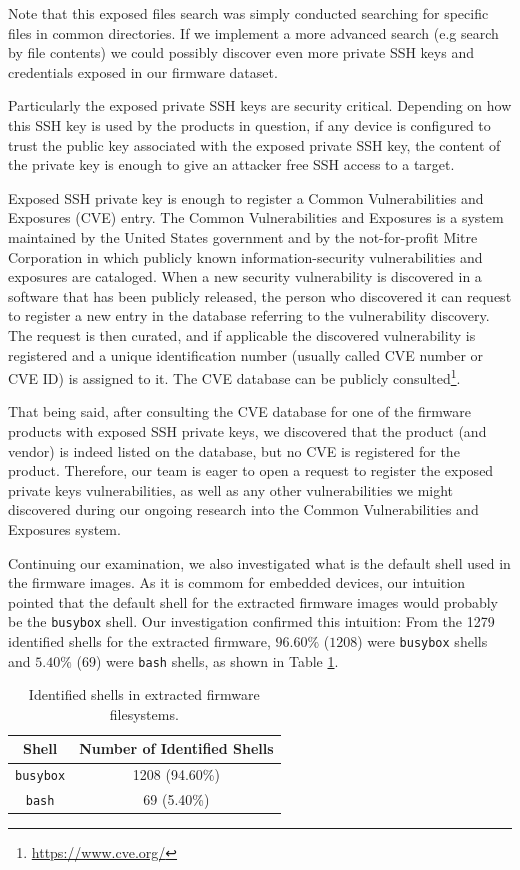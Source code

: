 Note that this exposed files search was simply conducted searching for specific files in common directories. If we implement a more advanced search (e.g search by file contents) we could possibly discover even more private SSH keys and credentials exposed in our firmware dataset.

Particularly the exposed private SSH keys are security critical. Depending on how this SSH key is used by the products in question, if any device is configured to trust the public key associated with the exposed private SSH key, the content of the private key is enough to give an attacker free SSH access to a target.

Exposed SSH private key is enough to register a Common Vulnerabilities and Exposures (CVE) entry. The Common Vulnerabilities and Exposures is a system maintained by the United States government and by the not-for-profit Mitre Corporation in which publicly known information-security vulnerabilities and exposures are cataloged. When a new security vulnerability is discovered in a software that has been publicly released, the person who discovered it can request to register a new entry in the database referring to the vulnerability discovery. The request is then curated, and if applicable the discovered vulnerability is registered and a unique identification number (usually called CVE number or CVE ID) is assigned to it. The CVE database can be publicly consulted\footnote{\url{https://www.cve.org/}}.

That being said, after consulting the CVE database for one of the firmware products with exposed SSH private keys, we discovered that the product (and vendor) is indeed listed on the database, but no CVE is registered for the product. Therefore, our team is eager to open a request to register the exposed private keys vulnerabilities, as well as any other vulnerabilities we might discovered during our ongoing research into the Common Vulnerabilities and Exposures system.

Continuing our examination, we also investigated what is the default shell used in the firmware images. As it is commom for embedded devices, our intuition pointed that the default shell for the extracted firmware images would probably be the {\tt busybox} shell. Our investigation confirmed this intuition: From the 1279 identified shells for the extracted firmware, $96.60\%$ ($1208$) were {\tt busybox} shells and $5.40\%$ (69) were {\tt bash} shells, as shown in Table \ref{tab:shell-count}.

\begin{table}[H]
\centering
\caption{Identified shells in extracted firmware filesystems.}
\begin{tabular}{|c|c|}
\hline
\textbf{Shell} & \textbf{Number of Identified Shells} \\ \hline
{\tt busybox}        & 1208 (94.60\%)              \\
{\tt bash}           & 69 (5.40\%)                 \\ \hline
\end{tabular}
\label{tab:shell-count}
\end{table}

